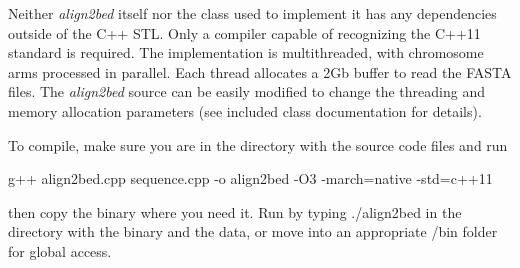 Neither {\itshape align2bed} itself nor the class used to implement it has any dependencies outside of the C++ S\+TL. Only a compiler capable of recognizing the C++11 standard is required. The implementation is multithreaded, with chromosome arms processed in parallel. Each thread allocates a 2\+Gb buffer to read the F\+A\+S\+TA files. The {\itshape align2bed} source can be easily modified to change the threading and memory allocation parameters (see included class documentation for details).

To compile, make sure you are in the directory with the source code files and run \begin{DoxyVerb}g++ align2bed.cpp sequence.cpp -o align2bed -O3 -march=native -std=c++11
\end{DoxyVerb}


then copy the binary where you need it. Run by typing {\ttfamily ./align2bed} in the directory with the binary and the data, or move into an appropriate /bin folder for global access. 